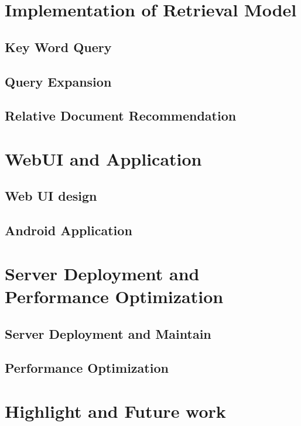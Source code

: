 \documentclass[conference]{IEEEtran}
\begin{document}
\section{Implementation of Retrieval Model}

\subsection{Key Word Query}

\subsection{Query Expansion}

\subsection{Relative Document Recommendation}

\section{WebUI and Application}
\subsection{Web UI design}
\subsection{Android Application}

\section{Server Deployment and Performance Optimization}
\subsection{Server Deployment and Maintain}

\subsection{Performance Optimization}

\section{Highlight and Future work}
\end{document}
